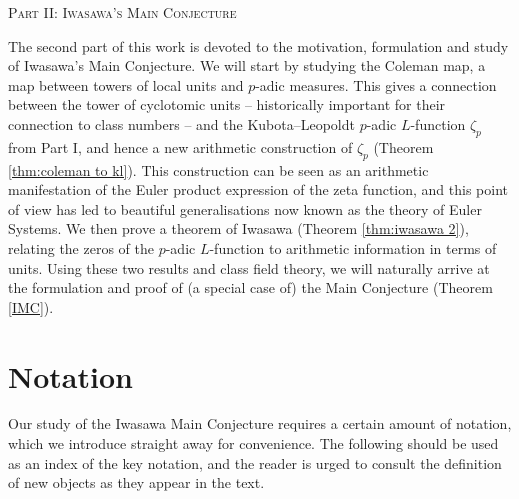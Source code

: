 \documentclass[a4paper,10pt, english, reqno]{smfart}
\numberwithin{equation}{section}
\begin{document}
\vspace{40pt}


 
\begin{center}\scshape{{\LARGE Part II: Iwasawa's Main Conjecture}}\\[20pt]
\end{center}

The second part of this work is devoted to the motivation, formulation and study of Iwasawa's Main Conjecture. We will start by studying the Coleman map, a map between towers of local units and $p$-adic measures. This gives a connection between the tower of cyclotomic units -- historically important for their connection to class numbers -- and the Kubota--Leopoldt $p$-adic $L$-function $\zeta_p$ from Part I, and hence a new arithmetic construction of $\zeta_p$ (Theorem \ref{thm:coleman to kl}). This construction can be seen as an arithmetic manifestation of the Euler product expression of the zeta function, and this point of view has led to beautiful generalisations now known as the theory of Euler Systems. We then prove a theorem of Iwasawa (Theorem \ref{thm:iwasawa 2}), relating the zeros of the $p$-adic $L$-function to arithmetic information in terms of units. Using these two results and class field theory, we will naturally arrive at the formulation and proof of (a special case of) the Main Conjecture (Theorem \ref{IMC}).


\section{Notation}\label{sec:coleman map notation}
Our study of the Iwasawa Main Conjecture requires a certain amount of notation, which we introduce straight away for convenience. The following should be used as an index of the key notation, and the reader is urged to consult the definition of new objects as they appear in the text. 
\end{document}
